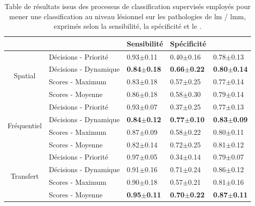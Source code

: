 \begin{table}[H]
    \centering
    \begin{tabular}{cllll}
        \toprule
        \multicolumn{1}{l}{}         &                              & Sensibilité           & Spécificité           & \fscore{}             \\ \midrule
        \multirow{4}{*}{Spatial}     & Décisions - Priorité         & 0.93$\pm$0.11             & 0.40$\pm$0.16             & 0.78$\pm$0.13             \\
                                     & Décisions - Dynamique        & \textbf{0.84$\pm$0.18}    & \textbf{0.66$\pm$0.22}    & \textbf{0.80$\pm$0.14}    \\
                                     & Scores - Maximum             & 0.83$\pm$0.18             & 0.57$\pm$0.25             & 0.77$\pm$0.14             \\
                                     & Scores - Moyenne             & 0.86$\pm$0.18             & 0.58$\pm$0.30             & 0.79$\pm$0.14             \\ \midrule
        \multirow{4}{*}{Fréquentiel} & Décisions - Priorité         & 0.93$\pm$0.07             & 0.37$\pm$0.25             & 0.77$\pm$0.13             \\
                                     & Décisions - Dynamique        & \textbf{0.84$\pm$0.12}    & \textbf{0.77$\pm$0.10}    & \textbf{0.83$\pm$0.09}    \\
                                     & Scores - Maximum             & 0.87$\pm$0.09             & 0.58$\pm$0.22             & 0.80$\pm$0.11             \\
                                     & Scores - Moyenne             & 0.82$\pm$0.14             & 0.72$\pm$0.25             & 0.81$\pm$0.12             \\ \midrule
        \multirow{4}{*}{Transfert}   & Décisions - Priorité         & 0.97$\pm$0.05             & 0.34$\pm$0.14             & 0.79$\pm$0.07             \\
                                     & Décisions - Dynamique        & 0.91$\pm$0.16             & 0.71$\pm$0.24             & 0.86$\pm$0.12             \\
                                     & Scores - Maximum             & 0.90$\pm$0.18             & 0.57$\pm$0.21             & 0.81$\pm$0.16             \\
                                     & Scores - Moyenne             & \textbf{0.95$\pm$0.11}    & \textbf{0.70$\pm$0.22}    & \textbf{0.87$\pm$0.11}    \\ \bottomrule
    \end{tabular}
    \caption{Table de résultats issus des processus de classification supervisés employés pour mener une classification au niveau lésionnel sur les pathologies de \gls{lm} / \gls{lmm}, exprimés selon la sensibilité, la spécificité et le \fscore{}.}
    \label{tab:results_lesion_classification_supervised_patient_lm}
\end{table}

